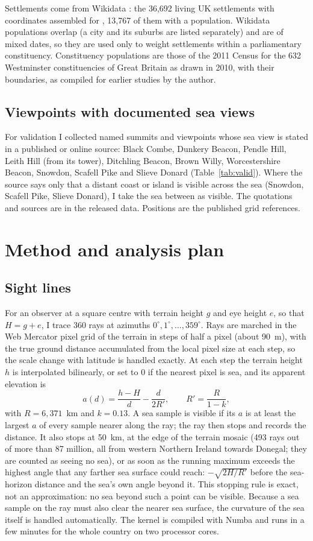 \documentclass[11pt,a4paper]{article}
\begin{document}
Settlements come from Wikidata \citep{wikidata}: the 36,692 living UK settlements with coordinates assembled for \citet{hotham2026sunless}, 13,767 of them with a population. Wikidata populations overlap (a city and its suburbs are listed separately) and are of mixed dates, so they are used only to weight settlements within a parliamentary constituency. Constituency populations are those of the 2011 Census for the 632 Westminster constituencies of Great Britain as drawn in 2010, with their boundaries, as compiled for earlier studies by the author.

\subsection{Viewpoints with documented sea views}
For validation I collected named summits and viewpoints whose sea view is stated in a published or online source: Black Combe, Dunkery Beacon, Pendle Hill, Leith Hill (from its tower), Ditchling Beacon, Brown Willy, Worcestershire Beacon, Snowdon, Scafell Pike and Slieve Donard (Table~\ref{tab:valid}). Where the source says only that a distant coast or island is visible across the sea (Snowdon, Scafell Pike, Slieve Donard), I take the sea between as visible. The quotations and sources are in the released data. Positions are the published grid references.

\section{Method and analysis plan}\label{sec:design}
\subsection{Sight lines}
For an observer at a square centre with terrain height $g$ and eye height $e$, so that $H=g+e$, I trace 360 rays at azimuths $0^\circ, 1^\circ, \dots, 359^\circ$. Rays are marched in the Web Mercator pixel grid of the terrain in steps of half a pixel (about 90~m), with the true ground distance accumulated from the local pixel size at each step, so the scale change with latitude is handled exactly. At each step the terrain height $h$ is interpolated bilinearly, or set to 0 if the nearest pixel is sea, and its apparent elevation is
\[ a(d) = \frac{h-H}{d} - \frac{d}{2R'}, \qquad R' = \frac{R}{1-k}, \]
with $R = 6{,}371$~km and $k = 0.13$. A sea sample is visible if its $a$ is at least the largest $a$ of every sample nearer along the ray; the ray then stops and records the distance. It also stops at 50~km, at the edge of the terrain mosaic (493 rays out of more than 87 million, all from western Northern Ireland towards Donegal; they are counted as seeing no sea), or as soon as the running maximum exceeds the highest angle that any farther sea surface could reach: $-\sqrt{2H/R'}$ before the sea-horizon distance and the sea's own angle beyond it. This stopping rule is exact, not an approximation: no sea beyond such a point can be visible. Because a sea sample on the ray must also clear the nearer sea surface, the curvature of the sea itself is handled automatically. The kernel is compiled with Numba and runs in a few minutes for the whole country on two processor cores.
\end{document}
